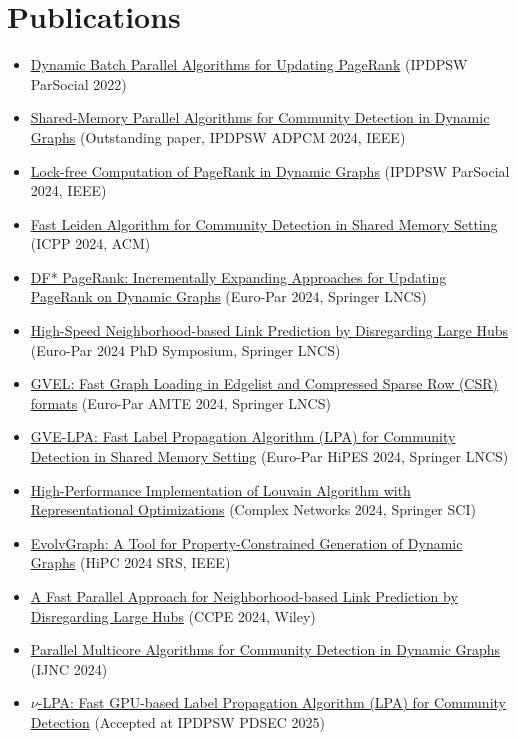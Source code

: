 \section*{Publications}

\begin{itemize}[noitemsep, leftmargin=*]
  \item \href{https://ieeexplore.ieee.org/abstract/document/9835216/}{Dynamic Batch Parallel Algorithms for Updating PageRank} (IPDPSW ParSocial 2022)
  \item \href{https://ieeexplore.ieee.org/abstract/document/10596428/}{Shared-Memory Parallel Algorithms for Community Detection in Dynamic Graphs} (Outstanding paper, IPDPSW ADPCM 2024, IEEE)
  \item \href{https://ieeexplore.ieee.org/abstract/document/10596502/}{Lock-free Computation of PageRank in Dynamic Graphs} (IPDPSW ParSocial 2024, IEEE)
  \item \href{https://dl.acm.org/doi/abs/10.1145/3673038.3673146}{Fast Leiden Algorithm for Community Detection in Shared Memory Setting} (ICPP 2024, ACM)
  \item \href{https://link.springer.com/chapter/10.1007/978-3-031-69583-4_22}{DF* PageRank: Incrementally Expanding Approaches for Updating PageRank on Dynamic Graphs} (Euro-Par 2024, Springer LNCS)
  \item \href{https://arxiv.org/abs/2401.11415}{High-Speed Neighborhood-based Link Prediction by Disregarding Large Hubs} (Euro-Par 2024 PhD Symposium, Springer LNCS)
  \item \href{https://arxiv.org/abs/2311.14650}{GVEL: Fast Graph Loading in Edgelist and Compressed Sparse Row (CSR) formats} (Euro-Par AMTE 2024, Springer LNCS)
  \item \href{https://arxiv.org/abs/2312.08140}{GVE-LPA: Fast Label Propagation Algorithm (LPA) for Community Detection in Shared Memory Setting} (Euro-Par HiPES 2024, Springer LNCS)
  \item \href{https://arxiv.org/abs/2312.04876}{High-Performance Implementation of Louvain Algorithm with Representational Optimizations} (Complex Networks 2024, Springer SCI)
  \item \href{https://ieeexplore.ieee.org/abstract/document/10898993}{EvolvGraph: A Tool for Property-Constrained Generation of Dynamic Graphs} (HiPC 2024 SRS, IEEE)
  \item \href{https://onlinelibrary.wiley.com/doi/10.1002/cpe.8331}{A Fast Parallel Approach for Neighborhood-based Link Prediction by Disregarding Large Hubs} (CCPE 2024, Wiley)
  \item \href{https://www.jstage.jst.go.jp/article/ijnc/15/1/15_2/_article/-char/ja/}{Parallel Multicore Algorithms for Community Detection in Dynamic Graphs} (IJNC 2024)
  \item \href{https://arxiv.org/abs/2411.11468}{$\nu$-LPA: Fast GPU-based Label Propagation Algorithm (LPA) for Community Detection} (Accepted at IPDPSW PDSEC 2025)
\end{itemize}




